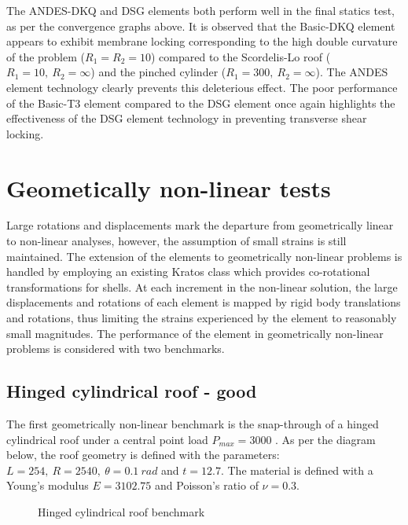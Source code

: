The ANDES-DKQ and DSG elements both perform well in the final statics test, as per the convergence graphs above. It is observed that the Basic-DKQ element appears to exhibit membrane locking corresponding to the high double curvature of the problem ($R_1=R_2 = 10$) compared to the Scordelis-Lo roof ($R_1= 10,\ R_2 = \infty$) and the pinched cylinder ($R_1= 300,\ R_2 = \infty$). The ANDES element technology clearly prevents this deleterious effect. The poor performance of the Basic-T3 element compared to the DSG element once again highlights the effectiveness of the DSG element technology in preventing transverse shear locking.
\newpage
\section{Geometically non-linear tests}

Large rotations and displacements mark the departure from geometrically linear to non-linear analyses, however, the assumption of small strains is still maintained. The extension of the elements to geometrically non-linear problems is handled by employing an existing Kratos class which provides co-rotational transformations for shells. At each increment in the non-linear solution, the large displacements and rotations of each element is mapped by rigid body translations and rotations, thus limiting the strains experienced by the element to reasonably small magnitudes. The performance of the element in geometrically non-linear problems is considered with two benchmarks.

\subsection{Hinged cylindrical roof - good}
\label{validation:hinged cyl roof}
The first geometrically non-linear benchmark is the snap-through of a hinged cylindrical roof under a central point load $P_{max} = 3000$ \cite{Sze2004}. As per the diagram below, the roof geometry is defined with the parameters: $L = 254,\ R = 2540,\ \theta=0.1\ rad$ and $t = 12.7$. The material is defined with a Young's modulus $E = 3102.75$ and Poisson's ratio of $\nu = 0.3$.

 
\begin{figure}[H]
	\caption{\label{ref_label_overall}Hinged cylindrical roof benchmark}
\end{figure}

